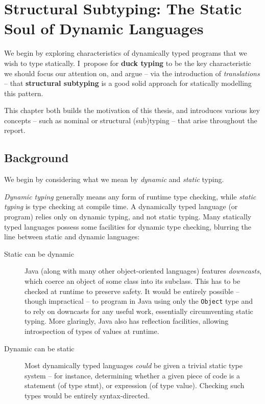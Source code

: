 \chapter
    [Structural Subtyping: The Static Soul of Dynamic Languages]
    {Structural Subtyping: \newline The Static Soul of Dynamic Languages}

We begin by exploring characteristics of dynamically typed programs that we wish to type statically. I~propose for \textbf{duck typing} to be the key characteristic we should focus our attention on, and argue -- via the introduction of \emph{translations} -- that \textbf{structural subtyping} is a good solid approach for statically modelling this pattern.

This chapter both builds the motivation of this thesis, and introduces various key concepts -- such as nominal or structural (sub)typing -- that arise throughout the report.

\section{Background}
\label{sec:background}

We begin by considering what we mean by \emph{dynamic} and \emph{static} typing.

\emph{Dynamic typing} generally means any form of runtime type checking, while \emph{static typing} is type checking at compile time. A dynamically typed language (or program) relies only on dynamic typing, and not static typing. 
Many statically typed languages possess some facilities for dynamic type checking, blurring the line between static and dynamic languages: \begin{description}
    \item[Static can be dynamic] Java (along with many other object-oriented languages) features \textit{downcasts}, which coerce an object of some class into its subclass. This has to be checked at runtime to preserve safety. It would be entirely possible -- though impractical -- to program in Java using only the \texttt{Object} type and to rely on downcasts for any useful work, essentially circumventing static typing. More glaringly, Java also has reflection facilities, allowing introspection of types of values at runtime. 
    \item[Dynamic can be static] Most dynamically typed languages \emph{could} be given a trivial static type system -- for instance, determining whether a given piece of code is a statement (of type \textsf{stmt}), or expression (of type \textsf{value}). Checking such types would be entirely syntax-directed.
\end{description} 

